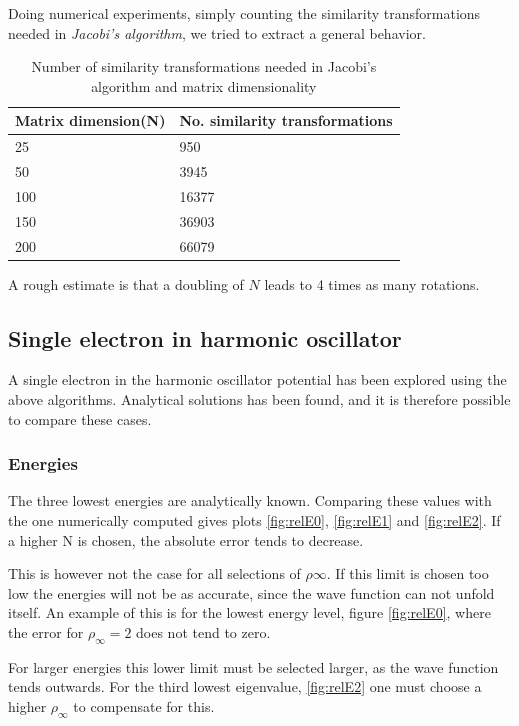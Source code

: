 \documentclass[11pt,a4paper,english,final]{article}
\numberwithin{equation}{section}
\begin{document}
Doing numerical experiments, simply counting the similarity transformations needed in \emph{Jacobi's algorithm}, we tried to extract a general behavior.   
\begin{table}[H]
\centering
  \caption{Number of similarity transformations needed in Jacobi's algorithm and matrix dimensionality }
\vspace{2mm}

\begin{tabular}{ |l|l| }
  \hline
  \textbf{Matrix dimension(N)} & \textbf{No. similarity transformations} \\
  \hline
  25 & 950 \\
  \hline
  50 & 3945 \\
  \hline
  100 & 16377 \\
  \hline
  150 & 36903 \\
  \hline
  200 & 66079 \\
  \hline
\end{tabular}
\vspace{0.2cm}
\end{table}
A rough estimate is that a doubling of $N$ leads to 4 times as many rotations. 

\subsection{Single electron in harmonic oscillator}

A single electron in the harmonic oscillator potential has been 
explored using the above algorithms. Analytical solutions has been
found, and it is therefore possible to compare these cases.

\subsubsection{Energies}

The three lowest energies are analytically known. Comparing these values
with the one numerically computed gives plots \ref{fig:relE0}, 
\ref{fig:relE1} and \ref{fig:relE2}. If a higher N is chosen, the 
absolute error tends to decrease.

This is however not the case for all selections 
of $\rho\infty$. If this limit is chosen too low the energies will 
not be as accurate, since the wave function can not unfold itself.
An example of this is for the lowest energy level, figure \ref{fig:relE0},
where the error for $\rho_\infty = 2$ does not tend to zero.

For larger energies this lower limit must be selected larger, as the 
wave function tends outwards. For the third lowest eigenvalue, 
\ref{fig:relE2} one must choose a higher $\rho_\infty$ to compensate 
for this.
\end{document}
